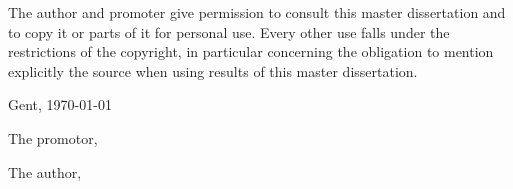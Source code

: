 

\par\vspace*{\fill}

The author and promoter give permission to consult this master dissertation and to copy it or parts of it for personal use. Every other use falls under the restrictions of the copyright, in particular concerning the obligation to mention explicitly the source when using results of this master dissertation.

\vspace{1cm}

Gent, \today %

\vspace{1cm}

\begin{minipage}[t][4cm][t]{0.5\textwidth}
\raggedright
The promotor,

\vspace{2.5cm}

\insertpromotor %
\end{minipage}
\begin{minipage}[t][4cm][t]{0.48\textwidth}
\raggedright
The author,

\vspace{2.5cm}

\insertauthor %
\end{minipage}

\thispagestyle{empty} 

